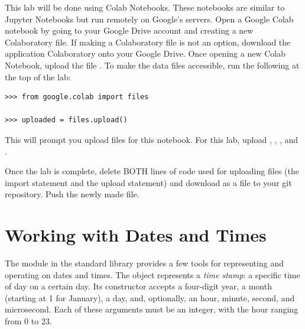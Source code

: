 
\begin{info}
This lab will be done using Colab Notebooks.
These notebooks are similar to Jupyter Notebooks but run remotely on Google's servers.
Open a Google Colab notebook by going to your Google Drive account and creating a new Colaboratory file.
If making a Colaboratory file is not an option, download the application Colaboratory onto your Google Drive.
Once opening a new Colab Notebook, upload the file .
To make the data files accessible, run the following at the top of the lab:
\begin{lstlisting}
>>> from google.colab import files

>>> uploaded = files.upload()
\end{lstlisting}
This will prompt you upload files for this notebook.
For this lab, upload , , , and .

Once the lab is complete, delete BOTH lines of code used for uploading files (the import statement and the upload statement) and download as a  file to your git repository.
Push the newly made  file.
\end{info}


\section*{Working with Dates and Times} %

The  module in the standard library provides a few tools for representing and operating on dates and times.
The  object represents a \emph{time stamp}: a specific time of day on a certain day.
Its constructor accepts a four-digit year, a month (starting at 1 for January), a day, and, optionally, an hour, minute, second, and microsecond.
Each of these arguments must be an integer, with the hour ranging from $0$ to $23$.

